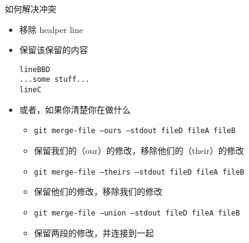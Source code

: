 \documentclass[aspectratio=169]{beamer}
\newcommand{\T}[1]{\texttt{#1}}
\begin{document}
\begin{frame}[fragile]{如何解决冲突}
  \begin{itemize}
    \item 移除 healper line
    \item 保留该保留的内容\begin{verbatim}
lineBBD
...some stuff...
lineC
\end{verbatim}
    \item 或者，如果你清楚你在做什么\begin{itemize}
      \item \T{git merge-file --ours --stdout fileD fileA fileB}
      \item 保留我们的（our）的修改，移除他们的（their）的修改
      \item \T{git merge-file --theirs --stdout fileD fileA fileB}
      \item 保留他们的修改，移除我们的修改
      \item \T{git merge-file --union --stdout fileD fileA fileB}
      \item 保留两段的修改，并连接到一起
    \end{itemize}
  \end{itemize}
\end{frame}
\end{document}
